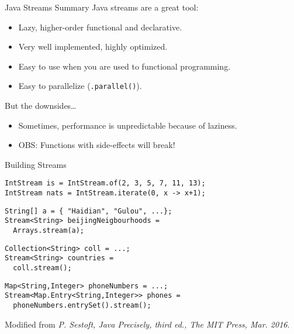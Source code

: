 \documentclass{beamer}
\begin{document}
\begin{frame}{Java Streams Summary}
  Java streams are a great tool:
  \begin{itemize}
  \item Lazy, higher-order functional and declarative.
  \item Very well implemented, highly optimized.
  \item Easy to use when you are used to functional programming.
  \item Easy to parallelize (\lstinline{.parallel()}).
  \end{itemize}

  \pause{} But the downsides\dots{}
  \begin{itemize}
  \item Sometimes, performance is unpredictable because of laziness.
  \item OBS: Functions with side-effects will break!
  \end{itemize}
\end{frame}

\begin{frame}[fragile]{Building Streams}
\begin{lstlisting}
IntStream is = IntStream.of(2, 3, 5, 7, 11, 13);
IntStream nats = IntStream.iterate(0, x -> x+1);
\end{lstlisting}
\pause{} \begin{lstlisting}
String[] a = { "Haidian", "Gulou", ...};
Stream<String> beijingNeigbourhoods =
  Arrays.stream(a);
\end{lstlisting}
\pause{} \begin{lstlisting}
Collection<String> coll = ...;
Stream<String> countries =
  coll.stream();
\end{lstlisting}
\pause{} \begin{lstlisting}
Map<String,Integer> phoneNumbers = ...;
Stream<Map.Entry<String,Integer>> phones =
  phoneNumbers.entrySet().stream();
\end{lstlisting}

\footnotesize{Modified from \emph{P. Sestoft, Java Precisely, third ed., The MIT Press, Mar. 2016}.}
\end{frame}
\end{document}
